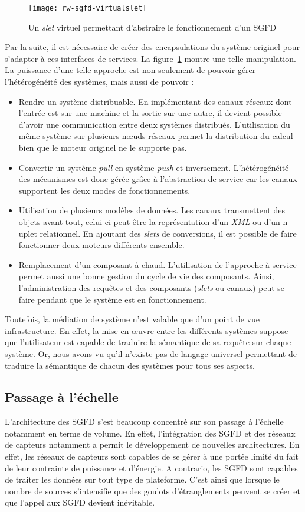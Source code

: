 \begin{figure}[ht]
    \centering
    \texttt{[image: rw-sgfd-virtualslet]}
    \caption{Un \textit{slet} virtuel permettant d'abstraire le fonctionnement d'un SGFD}\label{fig:rw:sgfd:virtualslet}
\end{figure}
Par la suite, il est nécessaire de créer des encapsulations du système originel pour s'adapter à ces interfaces de services. La figure~\ref{fig:rw:sgfd:virtualslet} montre une telle manipulation. La puissance d'une telle approche est non seulement de pouvoir gérer l'hétérogénéité des systèmes, mais aussi de pouvoir :
\begin{itemize}
	\item Rendre un système distribuable. En implémentant des canaux réseaux dont l'entrée est sur une machine et la sortie sur une autre, il devient possible d'avoir une communication entre deux systèmes distribués. L'utilisation du même système sur plusieurs nœuds réseaux permet la distribution du calcul bien que le moteur originel ne le supporte pas.
	\item Convertir un système \textit{pull} en système \textit{push} et inversement. L'hétérogénéité des mécanismes est donc gérée grâce à l'abstraction de service car les canaux supportent les deux modes de fonctionnements.
	\item Utilisation de plusieurs modèles de données. Les canaux transmettent des objets avant tout, celui-ci peut être la représentation d'un \textit{XML} ou d'un n-uplet relationnel. En ajoutant des \textit{slets} de conversions, il est possible de faire fonctionner deux moteurs différents ensemble.
	\item Remplacement d'un composant à chaud. L'utilisation de l'approche à service permet aussi une bonne gestion du cycle de vie des composants. Ainsi, l'administration des requêtes et des composants (\textit{slets} ou canaux) peut se faire pendant que le système est en fonctionnement.
\end{itemize}

Toutefois, la médiation de système n'est valable que d'un point de vue infrastructure. En effet, la mise en œuvre entre les différents systèmes suppose que l'utilisateur est capable de traduire la sémantique de sa requête sur chaque système. Or, nous avons vu qu'il n'existe pas de langage universel permettant de traduire la sémantique de chacun des systèmes pour tous ses aspects.

\subsection{Passage à l'échelle}
L'architecture des SGFD s'est beaucoup concentré sur son passage à l'échelle notamment en terme de volume. En effet, l'intégration des SGFD et des réseaux de capteurs notamment a permit le développement de nouvelles architectures. En effet, les réseaux de capteurs sont capables de se gérer à une portée limité du fait de leur contrainte de puissance et d'énergie. A contrario, les SGFD sont capables de traiter les données sur tout type de plateforme. C'est ainsi que lorsque le nombre de sources s'intensifie que des goulots d'étranglements peuvent se créer et que l'appel aux SGFD devient inévitable.

